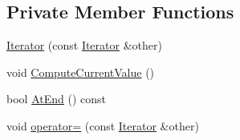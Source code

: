 \subsection*{\-Private \-Member \-Functions}
\begin{DoxyCompactItemize}
\item 
\hyperlink{classtesting_1_1internal_1_1CartesianProductGenerator2_1_1Iterator_a2b76c2e597bc9393f2b99e869e4fa8d2}{\-Iterator} (const \hyperlink{classtesting_1_1internal_1_1CartesianProductGenerator2_1_1Iterator}{\-Iterator} \&other)
\item 
void \hyperlink{classtesting_1_1internal_1_1CartesianProductGenerator2_1_1Iterator_a4c18cbbef042bab72ed484f5b6923908}{\-Compute\-Current\-Value} ()
\item 
bool \hyperlink{classtesting_1_1internal_1_1CartesianProductGenerator2_1_1Iterator_a6eb9b47ffa4b10f0dca403fc597faba0}{\-At\-End} () const 
\item 
void \hyperlink{classtesting_1_1internal_1_1CartesianProductGenerator2_1_1Iterator_ac087d740f6aa05ec07afd0c5c0327105}{operator=} (const \hyperlink{classtesting_1_1internal_1_1CartesianProductGenerator2_1_1Iterator}{\-Iterator} \&other)
\end{DoxyCompactItemize}
